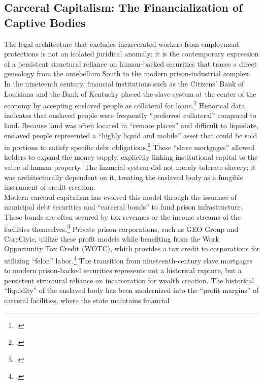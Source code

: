 \documentclass[
]{article}
\begin{document}
\subsection{\texorpdfstring{\textbf{Carceral Capitalism: The
Financialization of Captive
Bodies}}{Carceral Capitalism: The Financialization of Captive Bodies}}\label{carceral-capitalism-the-financialization-of-captive-bodies}

The legal architecture that excludes incarcerated workers from
employment protections is not an isolated juridical anomaly; it is the
contemporary expression of a persistent structural reliance on
human-backed securities that traces a direct genealogy from the
antebellum South to the modern prison-industrial complex.\\
In the nineteenth century, financial institutions such as the Citizens'
Bank of Louisiana and the Bank of Kentucky placed the slave system at
the center of the economy by accepting enslaved people as collateral for
loans.\footcite{yale_slave_mortgages} Historical data indicates that
enslaved people were frequently ``preferred collateral'' compared to
land. Because land was often located in ``remote places'' and difficult
to liquidate, enslaved people represented a ``highly liquid and mobile''
asset that could be sold in portions to satisfy specific debt
obligations.\footcite{yale_slave_mortgages} These ``slave mortgages''
allowed holders to expand the money supply, explicitly linking
institutional capital to the value of human property. The financial
system did not merely tolerate slavery; it was architecturally dependent
on it, treating the enslaved body as a fungible instrument of credit
creation.\\
Modern carceral capitalism has evolved this model through the issuance
of municipal debt securities and ``carceral bonds'' to fund prison
infrastructure. These bonds are often secured by tax revenues or the
income streams of the facilities
themselves.\footcite{insight_investment_carceral_bonds} Private prison
corporations, such as GEO Group and CoreCivic, utilize these profit
models while benefiting from the Work Opportunity Tax Credit (WOTC),
which provides a tax credit to corporations for utilizing ``felon''
labor.\footcite{princeton_legal_journal} The transition from
nineteenth-century slave mortgages to modern prison-backed securities
represents not a historical rupture, but a persistent structural
reliance on incarceration for wealth creation. The historical
``liquidity'' of the enslaved body has been modernized into the ``profit
margins'' of carceral facilities, where the state maintains financial
\end{document}
